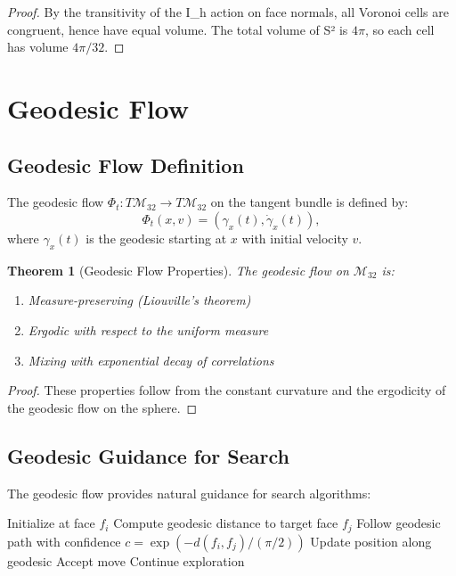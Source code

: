 \documentclass{article}
\newtheorem{theorem}{Theorem}
\theoremstyle{remark}
\begin{document}
\begin{proof}
By the transitivity of the I_h action on face normals, all Voronoi cells are congruent, hence have equal volume. The total volume of S² is $4\pi$, so each cell has volume $4\pi/32$.
\end{proof}

\section{Geodesic Flow}

\subsection{Geodesic Flow Definition}

The geodesic flow $\Phi_t: T\mathcal{M}_{32} \to T\mathcal{M}_{32}$ on the tangent bundle is defined by:
\[
\Phi_t(x, v) = (\gamma_x(t), \dot{\gamma}_x(t)),
\]
where $\gamma_x(t)$ is the geodesic starting at $x$ with initial velocity $v$.

\begin{theorem}[Geodesic Flow Properties]
The geodesic flow on $\mathcal{M}_{32}$ is:
\begin{enumerate}
\item Measure-preserving (Liouville's theorem)
\item Ergodic with respect to the uniform measure
\item Mixing with exponential decay of correlations
\end{enumerate}
\end{theorem}

\begin{proof}
These properties follow from the constant curvature and the ergodicity of the geodesic flow on the sphere.
\end{proof}

\subsection{Geodesic Guidance for Search}

The geodesic flow provides natural guidance for search algorithms:

\begin{algorithm}
\caption{Geodesic-Guided Search}
\begin{algorithmic}[1]
\STATE Initialize at face $f_i$
\STATE Compute geodesic distance to target face $f_j$
\STATE Follow geodesic path with confidence $c = \exp(-d(f_i, f_j)/(\pi/2))$
\STATE Update position along geodesic
\STATE Accept move
\ELSE
\STATE Continue exploration
\ENDIF
\end{algorithmic}
\end{algorithm}
\end{document}
